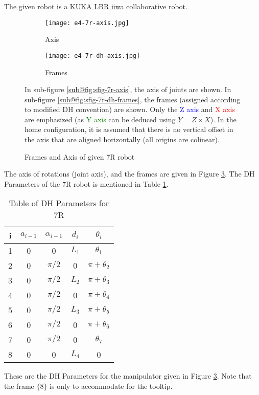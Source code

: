 The given robot is a \href{https://www.kuka.com/en-in/products/robotics-systems/industrial-robots/lbr-iiwa}{KUKA LBR iiwa} collaborative robot.

\begin{figure}[ht]
    \centering
    \begin{subfigure}[b]{0.9\textwidth}
        \centering
        \texttt{[image: e4-7r-axis.jpg]}
        \caption{Axis}
        \label{fig:sfig-7r-axis}
    \end{subfigure}
    \begin{subfigure}[b]{0.9\textwidth}
        \centering
        \texttt{[image: e4-7r-dh-axis.jpg]}
        \caption{Frames}
        \label{fig:sfig-7r-dh-frames}
    \end{subfigure}
    \caption{Frames and Axis of given 7R robot}
    \label{fig:7r-frames}
    \small
        In sub-figure \ref{sub@fig:sfig-7r-axis}, the axis of joints are shown. In sub-figure \ref{sub@fig:sfig-7r-dh-frames}, the frames (assigned according to modified DH convention) are shown. Only the \textcolor{blue}{Z axis} and \textcolor{red}{X axis} are emphasized (as \textcolor{green}{Y axis} can be deduced using $Y = Z \times X$). In the home configuration, it is assumed that there is no vertical offset in the axis that are aligned horizontally (all origins are colinear).
\end{figure}


The axis of rotations (joint axis), and the frames are given in Figure \ref{fig:7r-frames}. The DH Parameters of the 7R robot is mentioned in Table \ref{tab:7r-dh-params}.

\begin{table}[ht]
    \centering
    \begin{tabular}{ ||c|c|c|c|c|| }
        \hline\hline
        \textbf{i} & $a_{i-1}$ & $\alpha_{i-1}$ & $d_i$ & $\theta_i$ \\
        \hline
        1 & 0 & 0 & $L_1$ & $\theta_1$ \\
        2 & 0 & $\pi/2$ & 0 & $\pi + \theta_2$ \\
        3 & 0 & $\pi/2$ & $L_2$ & $\pi+\theta_3$ \\
        4 & 0 & $\pi/2$ & 0 & $\pi + \theta_4$ \\
        5 & 0 & $\pi/2$ & $L_3$ & $\pi + \theta_5$ \\
        6 & 0 & $\pi/2$ & 0 & $\pi + \theta_6$ \\
        7 & 0 & $\pi/2$ & 0 & $\theta_7$ \\
        8 & 0 & 0 & $L_4$ & 0 \\
        \hline\hline
    \end{tabular}
    \caption{\label{tab:7r-dh-params}Table of DH Parameters for 7R}
    \small
        These are the DH Parameters for the manipulator given in Figure \ref{fig:7r-frames}. Note that the frame $\{8\}$ is only to accommodate for the tooltip.
\end{table}

